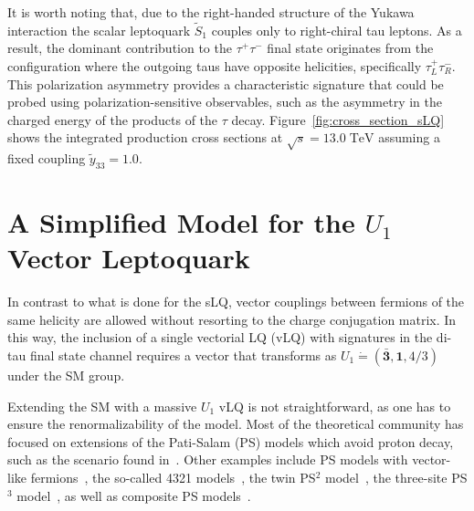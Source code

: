 It is worth noting that, due to the right-handed structure of the Yukawa interaction the scalar leptoquark $\tilde{S}_1$ couples only to right-chiral tau leptons. As a result, the dominant contribution to the $\tau^+\tau^-$ final state originates from the configuration where the outgoing taus have opposite helicities, specifically $\tau^+_L \tau^-_R$. This polarization asymmetry provides a characteristic signature that could be probed using polarization-sensitive observables, such as the asymmetry in the charged energy of the products of the $\tau$ decay. Figure~\ref{fig:cross_section_sLQ} shows the integrated production cross sections at $\sqrt{s} = 13.0\; \si{\tera\electronvolt}$ assuming a fixed coupling $\tilde{y}_{33} = 1.0$.

\section{A Simplified Model for the $U_1$ Vector Leptoquark}

In contrast to what is done for the sLQ, vector couplings between fermions of the same helicity are allowed without resorting to the charge conjugation matrix. In this way, the inclusion of a single vectorial LQ (vLQ) with signatures in the di-tau final state channel requires a vector that transforms as $U_1  \dot= (\bar{\mathbf{3}}, \mathbf{1}, 4/3)$ under the SM group.

Extending the SM with a massive $U_1$ vLQ is not straightforward, as one has to ensure the renormalizability of the model. Most of the theoretical community has focused on extensions of the Pati-Salam (PS) models which avoid proton decay, such as the scenario found in~\parencite{Assad:2017iib}. Other examples include PS models with vector-like fermions~\parencite{Calibbi:2017qbu,Blanke:2018sro,Iguro:2021kdw}, the so-called 4321 models~\parencite{DiLuzio:2017vat,Greljo:2018tuh,DiLuzio2018}, the twin PS$^2$ model~\parencite{King:2021jeo,FernandezNavarro:2022gst}, the three-site PS$^3$ model~\parencite{Bordone:2017bld,Bordone:2018nbg,Fuentes-Martin:2022xnb}, as well as composite PS models~\parencite{Gripaios:2009dq,Barbieri:2016las,Barbieri:2017tuq}.


